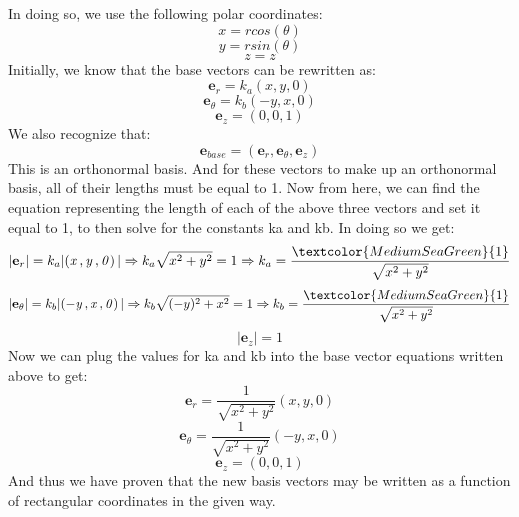 \documentclass{article}
\begin{document}
In doing so, we use the following polar coordinates:
\[x = r cos(\theta)\]
\[y = r sin(\theta)\]
\[z = z\]
Initially, we know that the base vectors can be rewritten as:
\begin{equation}
\mathbf{e}_r = k_a(x,y,0)
\end{equation}
\begin{equation}
\mathbf{e}_\theta = k_b(-y,x,0)
\end{equation}
\begin{equation}
\mathbf{e}_z = (0,0,1)
\end{equation}
We also recognize that:
\begin{equation}
\mathbf{e}_{base} = (\mathbf{e}_r, \mathbf{e}_\theta,\mathbf{e}_z)
\end{equation}
This is an orthonormal basis. And for these vectors to make up an orthonormal basis, all of their lengths must be equal to 1. Now from here, we can find the equation representing the length of each of the above three vectors and set it equal to 1, to then solve for the constants ka and kb.
In doing so we get:
\begin{equation} \label{eq:8}
    {| \mathbf{e}_{r}|}=k_{a}{| \mathit{(x\,,y\,,0)\,}|}\Rightarrow k_{a}\sqrt{x^{2}+y^{2}}=1\Rightarrow k_{a}=\frac{\textcolor{MediumSeaGreen}{1}}{\sqrt{x^{2}+y^{2}}}
\end{equation}
\begin{equation} \label{eq:9}
    {| \mathbf{e}_{\theta}|}=k_{b}{| \mathit{(-y\,,x\,,0)\,}|}\Rightarrow k_{b}\sqrt{(-y)^{2}+x^{2}}=1\Rightarrow k_{b}=\frac{\textcolor{MediumSeaGreen}{1}}{\sqrt{x^{2}+y^{2}}}
\end{equation}
\begin{equation}
    {| \mathbf{e}_{z}|}=1
\end{equation}
Now we can plug the values for ka and kb into the base vector equations written above to get:
\begin{equation*}
    \mathbf{e}_{r}=\frac{1}{\sqrt{x^{2}+y^{2}}}(x ,y ,0)
\end{equation*}
\begin{equation}
    \mathbf{e}_{\theta}=\frac{1}{\sqrt{x^{2}+y^{2}}}(-y ,x ,0)
\end{equation}
\begin{equation} \label{eq:12}
    \mathbf{e}_{z}=(0,0,1)
\end{equation}
And thus we have proven that the new basis vectors may be written as a function of rectangular coordinates in the given way.
\end{document}
